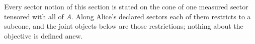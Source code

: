 
Every sector notion of this section is stated on the cone of one measured
sector tensored with all of $A$. Along Alice's declared sectors each of them
restricts to a subcone, and the joint objects below are those restrictions;
nothing about the objective is defined anew.

